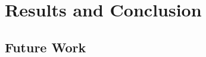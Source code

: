 
\chapter{Results and Conclusion}
\label{chap:conclusion}

\section{Future Work}
\label{section: Future work}

